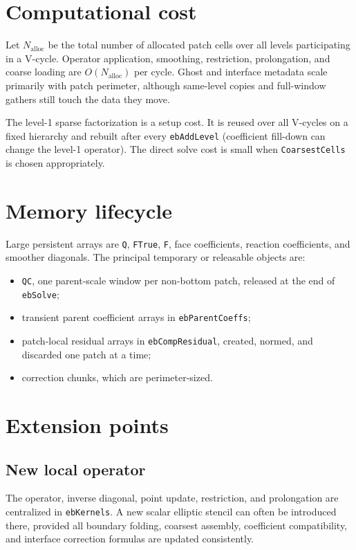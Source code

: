 \documentclass[11pt,oneside,openany]{book}
\newcommand{\code}[1]{\textnormal{\texttt{#1}}}
\begin{document}
\section{Computational cost}
Let $N_{\mathrm{alloc}}$ be the total number of allocated patch cells over all levels participating in a V-cycle. Operator application, smoothing, restriction, prolongation, and coarse loading are $O(N_{\mathrm{alloc}})$ per cycle. Ghost and interface metadata scale primarily with patch perimeter, although same-level copies and full-window gathers still touch the data they move.

The level-1 sparse factorization is a setup cost. It is reused over all V-cycles on a fixed hierarchy and rebuilt after every \code{ebAddLevel} (coefficient fill-down can change the level-1 operator). The direct solve cost is small when \code{CoarsestCells} is chosen appropriately.

\section{Memory lifecycle}
Large persistent arrays are \code{Q}, \code{FTrue}, \code{F}, face coefficients, reaction coefficients, and smoother diagonals. The principal temporary or releasable objects are:
\begin{itemize}
\item \code{QC}, one parent-scale window per non-bottom patch, released at the end of \code{ebSolve};
\item transient parent coefficient arrays in \code{ebParentCoeffs};
\item patch-local residual arrays in \code{ebCompResidual}, created, normed, and discarded one patch at a time;
\item correction chunks, which are perimeter-sized.
\end{itemize}

\section{Extension points}
\subsection{New local operator}
The operator, inverse diagonal, point update, restriction, and prolongation are centralized in \code{ebKernels}. A new scalar elliptic stencil can often be introduced there, provided all boundary folding, coarsest assembly, coefficient compatibility, and interface correction formulas are updated consistently.
\end{document}
